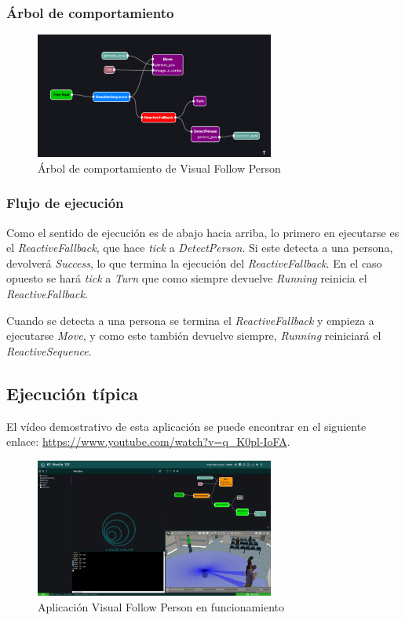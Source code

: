 \subsubsection{Árbol de comportamiento}
\begin{figure}[H]
    \centering
    \includegraphics[width=0.7\textwidth]{figures/validation/FollowPerson_1.png}
    \caption{Árbol de comportamiento de Visual Follow Person}
    \label{fig:ejemplo}
\end{figure}

\subsubsection{Flujo de ejecución}

Como el sentido de ejecución es de abajo hacia arriba, lo primero en ejecutarse es el \textit{ReactiveFallback}, que hace \textit{tick} a \textit{DetectPerson}. Si este detecta a una persona, devolverá \textit{Success}, lo que termina la ejecución del \textit{ReactiveFallback}. En el caso opuesto se hará \textit{tick} a \textit{Turn} que como siempre devuelve \textit{Running} reinicia el \textit{ReactiveFallback}.

Cuando se detecta a una persona se termina el \textit{ReactiveFallback} y empieza a ejecutarse \textit{Move}, y como este también devuelve siempre, \textit{Running} reiniciará el \textit{ReactiveSequence}.

\subsection{Ejecución típica}

El vídeo demostrativo de esta aplicación se puede encontrar en el siguiente enlace: \url{https://www.youtube.com/watch?v=q_K0pl-IoFA}. 

\begin{figure}[H]
    \centering
    \includegraphics[width=0.7\textwidth]{figures/validation/followPerson-teaser.jpg}
    \caption{Aplicación Visual Follow Person en funcionamiento}
    \label{fig:ejemplo}
\end{figure}


